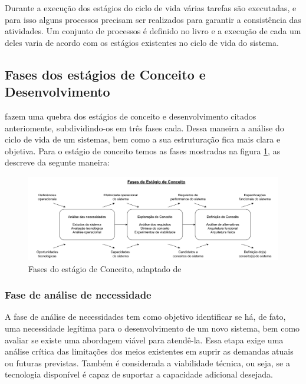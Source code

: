 	Durante a execução dos estágios do ciclo de vida várias tarefas são executadas, e para isso alguns processos precisam ser realizados para garantir a consistência das atividades. Um conjunto
	de processos é definido no livro e a execução de cada um deles varia de acordo com os estágios existentes no ciclo de vida do sistema.

	\subsection{Fases dos estágios de Conceito e Desenvolvimento}\label{sec:revisao:ciclodevida:fases}

	\cite{kossiakoff2020systems} fazem uma quebra dos estágios de conceito e desenvolvimento citados anteriomente, subdividindo-os em três fases cada. Dessa maneira a análise do ciclo de vida
	de um sistemas, bem como a sua estruturação fica mais clara e objetiva.
	Para o estágio de conceito temos as fases mostradas na figura \ref{fig:revisao:conceptStagePhases}, \cite{kossiakoff2020systems} as descreve da segunte maneira:
	
	\begin{figure}[h]
		\centering
		\includegraphics[width=\textwidth]{./figuras/conceptPhases.pdf}
		\caption{Fases do estágio de Conceito, adaptado de \citep{kossiakoff2020systems}}
		\label{fig:revisao:conceptStagePhases}
	\end{figure}

	\subsubsection*{Fase de análise de necessidade}
	 
	A fase de análise de necessidades tem como objetivo identificar se há, de fato, uma necessidade legítima para o desenvolvimento de um novo sistema, bem como 
	avaliar se existe uma abordagem viável para atendê-la. Essa etapa exige uma análise crítica das limitações dos meios existentes em
	suprir as demandas atuais ou futuras previstas. Também é considerada a viabilidade técnica, ou seja, se a tecnologia disponível é capaz de suportar a 
	capacidade adicional desejada.
	
